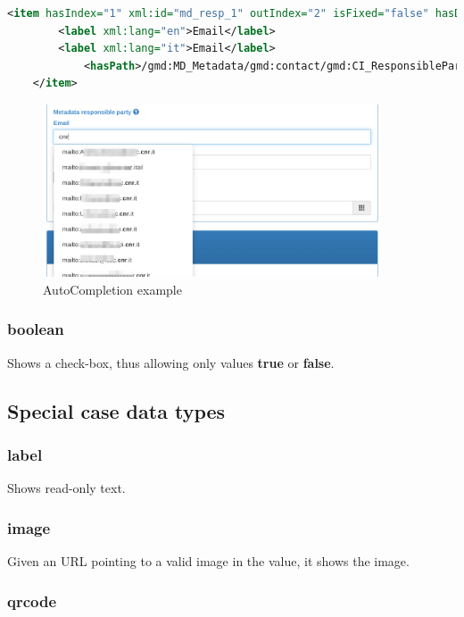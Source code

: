 \documentclass[10pt]{article}
\begin{document}
\begin{lstlisting}[language=xml]
	<item hasIndex="1" xml:id="md_resp_1" outIndex="2" isFixed="false" hasDatatype="autoCompletion" datasource="person">
		<label xml:lang="en">Email</label>
		<label xml:lang="it">Email</label>
			<hasPath>/gmd:MD_Metadata/gmd:contact/gmd:CI_ResponsibleParty/gmd:contactInfo/gmd:CI_Contact/gmd:address/gmd:CI_Address/gmd:electronicMailAddress/gco:CharacterString</hasPath>
	</item>
\end{lstlisting}
\begin{figure}[h]
	\caption{AutoCompletion example}
	\includegraphics[width=10cm]{Autocompletion.png}
	\centering
\end{figure}


\subsubsection{boolean}
\label{boolean}

Shows a check-box, thus allowing only values \textbf{true} or \textbf{false}.


\subsection{Special case data types}
\subsubsection{label}
\label{label}

Shows read-only text.

\subsubsection{image}
\label{image}

Given an URL pointing to a valid image in the value, it shows the image.

\subsubsection{qrcode}
\label{qrcode}
\end{document}
